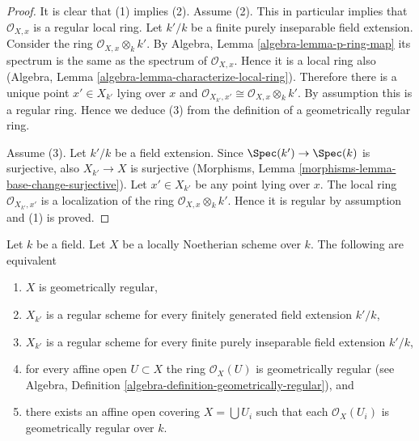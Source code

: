 \begin{proof}
It is clear that (1) implies (2).
Assume (2). This in particular implies that $\mathcal{O}_{X, x}$
is a regular local ring. Let $k'/k$ be a finite purely inseparable
field extension. Consider the ring $\mathcal{O}_{X, x} \otimes_k k'$.
By Algebra, Lemma \ref{algebra-lemma-p-ring-map}
its spectrum is the same as the spectrum of $\mathcal{O}_{X, x}$.
Hence it is a local ring also
(Algebra, Lemma \ref{algebra-lemma-characterize-local-ring}).
Therefore there is a unique point $x' \in X_{k'}$ lying over $x$
and $\mathcal{O}_{X_{k'}, x'} \cong \mathcal{O}_{X, x} \otimes_k k'$.
By assumption this is a regular ring. Hence we deduce (3)
from the definition of a geometrically regular ring.

\medskip\noindent
Assume (3). Let $k'/k$ be a field extension. Since
$\Spec(k') \to \Spec(k)$ is surjective, also
$X_{k'} \to X$ is surjective
(Morphisms, Lemma \ref{morphisms-lemma-base-change-surjective}).
Let $x' \in X_{k'}$ be any point lying over $x$.
The local ring $\mathcal{O}_{X_{k'}, x'}$
is a localization of the ring $\mathcal{O}_{X, x} \otimes_k k'$.
Hence it is regular by assumption and (1) is proved.
\end{proof}

\begin{lemma}
\label{lemma-geometrically-regular}
Let $k$ be a field.
Let $X$ be a locally Noetherian scheme over $k$.
The following are equivalent
\begin{enumerate}
\item $X$ is geometrically regular,
\item $X_{k'}$ is a regular scheme for every finitely generated field
extension $k'/k$,
\item $X_{k'}$ is a regular scheme for every finite purely inseparable
field extension $k'/k$,
\item for every affine open $U \subset X$ the ring $\mathcal{O}_X(U)$
is geometrically regular (see
Algebra, Definition \ref{algebra-definition-geometrically-regular}), and
\item there exists an affine open covering $X = \bigcup U_i$ such that
each $\mathcal{O}_X(U_i)$ is geometrically regular over $k$.
\end{enumerate}
\end{lemma}

